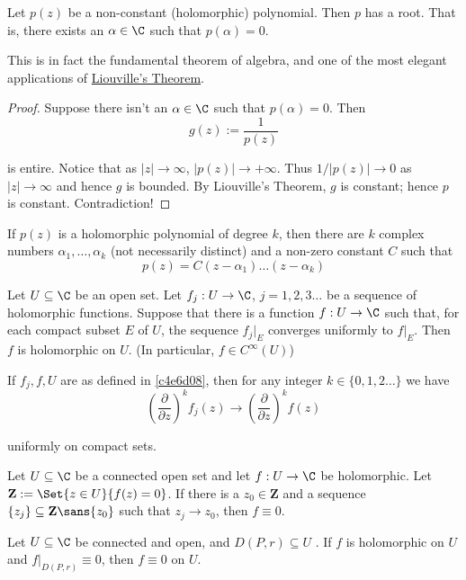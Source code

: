 Let $p(z)$ be a non-constant (holomorphic) polynomial. Then $p$ has a root.
That is, there exists an $\alpha\in\C$ such that $p(\alpha)=0$.

This is in fact the fundamental theorem of algebra, and one of the most elegant
applications of \href{cf6d8a9}{Liouville's Theorem}.

\begin{proof}
  Suppose there isn't an $\alpha\in\C$ such that $p(\alpha)=0$. Then
  $$
    g(z):=\frac1{p(z)}
  $$

  is entire. Notice that as $|z|\to\infty$, $|p(z)|\to+\infty$. Thus
  $1/|p(z)|\to0$ as $|z|\to\infty$ and hence $g$ is bounded. By Liouville's
  Theorem, $g$ is constant; hence $p$ is constant. Contradiction!
\end{proof}

\Corollary{}\label{cae4be0}

If $p(z)$ is a holomorphic polynomial of degree $k$, then there are $k$ complex
numbers $\alpha_1,\ldots,\alpha_k$ (not necessarily distinct) and a non-zero
constant $C$ such that
$$
  p(z)=C(z-\alpha_1)\ldots(z-\alpha_k)
$$

\Theorem{}\label{c4e6d08}

Let $U\subseteq\C$ be an open set. Let $f_j:U\to\C$, $j=1,2,3\ldots$ be a
sequence of holomorphic functions. Suppose that there is a function $f:U\to\C$
such that, for each compact subset $E$ of $U$, the sequence $f_j|_E$ converges
uniformly to $f|_E$. Then $f$ is holomorphic on $U$. (In particular, $f\in
C^\infty(U)$)

\Corollary{}\label{f5163f1}

If $f_j,f,U$ are as defined in \autoref{c4e6d08}, then for any integer
$k\in\{0,1,2\ldots\}$ we have
$$
  \left(\frac\partial{\partial z}\right)^kf_j(z)\to\left(\frac\partial{\partial z}\right)^kf(z)
$$

uniformly on compact sets.

\Theorem{}\label{bdc2857}

Let $U\subseteq\C$ be a connected open set and let $f:U\to\C$ be holomorphic.
Let $\mathbf Z:=\Set{z\in U}{f(z)=0}$. If there is a $z_0\in\mathbf Z$ and a
sequence $\{z_j\}\subseteq\mathbf Z\sans{z_0}$ such that $z_j\to z_0$, then
$f\equiv0$.

\Corollary{}\label{b919101}

Let $U\subseteq\C$ be connected and open, and $D(P,r)\subseteq U$ . If $f$ is
holomorphic on $U$ and $f|_{D(P,r)}\equiv0$, then $f\equiv0$ on $U$.


